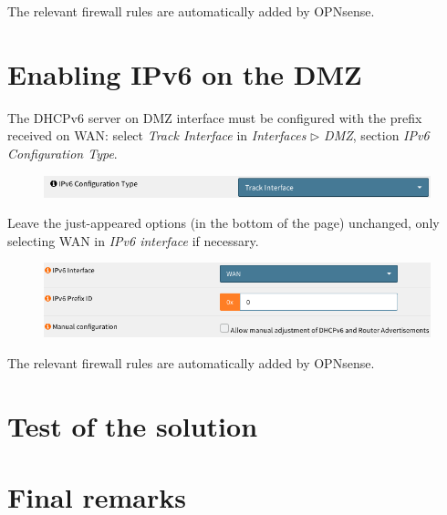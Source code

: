 \documentclass[draft]{homework}
\newcommand{\dhcp}{DHCPv6\xspace}
\newcommand{\ip}{IPv6\xspace}
\newcommand{\opn}{OPNsense\xspace}
\begin{document}
    The relevant firewall rules are automatically added by \opn.
    
    
    \section{Enabling \ip on the DMZ}
    The \dhcp server on DMZ interface must be configured with the prefix received on WAN: select \textit{Track Interface} in \textit{Interfaces} $\triangleright$ \textit{DMZ}, section \textit{\ip Configuration Type}.
    \begin{figure}[H]
        \centering
        \includegraphics[width=\linewidth]{images/dmz-ipv6}
        \label{fig:dmz-ipv6}
    \end{figure}
    \vspace{-15pt}
    
    Leave the just-appeared options (in the bottom of the page) unchanged, only selecting WAN in \textit{\ip interface} if necessary.
    \begin{figure}[H]
        \centering
        \includegraphics[width=\linewidth]{images/dmz-track}
        \label{fig:dmz-track}
    \end{figure}
    \vspace{-25pt}
    
    The relevant firewall rules are automatically added by \opn.
    
    
    \section{Test of the solution}
    
    
    \section{Final remarks}
\end{document}
